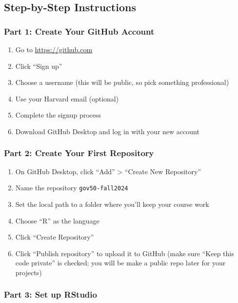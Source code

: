 \documentclass[
  11pt,
  letterpaper]{article}
\providecommand{\tightlist}{%
  \setlength{\itemsep}{0pt}\setlength{\parskip}{0pt}}
\begin{document}
\subsection{Step-by-Step Instructions}\label{step-by-step-instructions}

\subsubsection{Part 1: Create Your GitHub
Account}\label{part-1-create-your-github-account}

\begin{enumerate}
\def\labelenumi{\arabic{enumi}.}
\tightlist
\item
  Go to \url{https://github.com}
\item
  Click ``Sign up''
\item
  Choose a username (this will be public, so pick something
  professional)
\item
  Use your Harvard email (optional)
\item
  Complete the signup process
\item
  Download GitHub Desktop and log in with your new account
\end{enumerate}

\subsubsection{Part 2: Create Your First
Repository}\label{part-2-create-your-first-repository}

\begin{enumerate}
\def\labelenumi{\arabic{enumi}.}
\tightlist
\item
  On GitHub Desktop, click ``Add'' \textgreater{} ``Create New
  Repository''
\item
  Name the repository \texttt{gov50-fall2024}
\item
  Set the local path to a folder where you'll keep your course work
\item
  Choose ``R'' as the language
\item
  Click ``Create Repository''
\item
  Click ``Publish repository'' to upload it to GitHub (make sure ``Keep
  this code private'' is checked; you will be make a public repo later
  for your projects)
\end{enumerate}

\subsubsection{Part 3: Set up RStudio}\label{part-3-set-up-rstudio}
\end{document}
